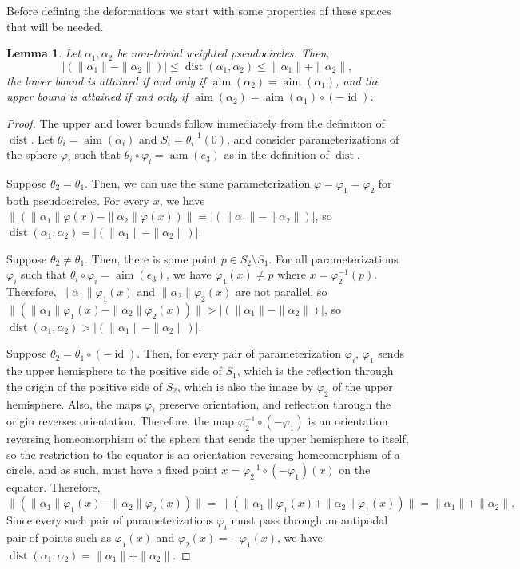 \documentclass[11pt]{article}
\numberwithin{equation}{section}
\newtheorem{lemma}[theorem]{Lemma}
\theoremstyle{remark}
\let\phi\varphi
\DeclareMathOperator{\dist}{dist}
\DeclareMathOperator{\aim}{aim}
\DeclareMathOperator{\id}{id}
\begin{document}
Before defining the deformations we start with some properties of these spaces that will be needed.

\begin{lemma}\label{lemma-pseudocircle-dist}
Let $\alpha_1,\alpha_2$ be non-trivial weighted pseudocircles.
Then,
\[\left|\left(\|\alpha_1\|-\|\alpha_2\|\right)\right| \leq \dist(\alpha_1,\alpha_2) \leq \|\alpha_1\|+\|\alpha_2\|,\]
the lower bound is attained if and only if $\aim(\alpha_2) = \aim(\alpha_1)$,
and the upper bound is attained if and only if $\aim(\alpha_2) = \aim(\alpha_1)\circ(-\id)$.
\end{lemma}

\begin{proof}
The upper and lower bounds follow immediately from the definition of $\dist$.
Let $\theta_i = \aim(\alpha_i)$ and $S_i = \theta_i^{-1}(0)$,
and consider parameterizations of the sphere $\phi_i$ such that $\theta_i \circ \phi_i = \aim(e_3)$ as in the definition of $\dist$.

Suppose $\theta_2=\theta_1$. Then, we can use the same parameterization $\phi = \phi_1 = \phi_2$ for both pseudocircles.
For every $x$, we have
$\|(\|\alpha_1\|\phi(x) - \|\alpha_2\|\phi(x))\| = \left|(\|\alpha_1\|-\|\alpha_2\|)\right|$,
so $\dist(\alpha_1,\alpha_2) = \left|(\|\alpha_1\|-\|\alpha_2\|)\right|$.

Suppose $\theta_2\neq \theta_1$. Then, there is some point $p \in S_2 \setminus S_1$. For all parameterizations $\phi_i$ such that $\theta_i \circ \phi_i = \aim(e_3)$, we have $\phi_1(x) \neq p$ where $x = \phi_2^{-1}(p)$. Therefore, $\|\alpha_1\|\phi_1(x)$ and $\|\alpha_2\|\phi_2(x)$ are not parallel, so
$\|(\|\alpha_1\|\phi_1(x) - \|\alpha_2\|\phi_2(x))\| > \left|(\|\alpha_1\|-\|\alpha_2\|)\right|$,
so $\dist(\alpha_1,\alpha_2) > \left|(\|\alpha_1\|-\|\alpha_2\|)\right|$.

Suppose $\theta_2 = \theta_1\circ(-\id)$.
Then, for every pair of parameterization $\phi_i$, $\phi_1$ sends the upper hemisphere to the positive side of $S_1$, which is the reflection through the origin of the positive side of $S_2$, which is also the image by $\phi_2$ of the upper hemisphere.
Also, the maps $\phi_i$ preserve orientation, and reflection through the origin reverses orientation.
Therefore, the map $\phi_2^{-1}\circ (-\phi_1)$ is an orientation reversing homeomorphism of the sphere that sends the upper hemisphere to itself, so the restriction to the equator is an orientation reversing homeomorphism of a circle, and as such, must have a fixed point $x = \phi_2^{-1}\circ(-\phi_1)(x)$ on the equator. Therefore,
\[
\|(\|\alpha_1\|\phi_1(x) - \|\alpha_2\|\phi_2(x))\| = \|(\|\alpha_1\|\phi_1(x) + \|\alpha_2\|\phi_1(x))\| = \|\alpha_1\| + \|\alpha_2\|.
\]
Since every such pair of parameterizations $\phi_i$ must pass through an antipodal pair of points such as $\phi_1(x)$ and $\phi_2(x) = -\phi_1(x)$, we have $\dist(\alpha_1,\alpha_2) = \|\alpha_1\|+\|\alpha_2\|$.


\end{proof}
\end{document}
